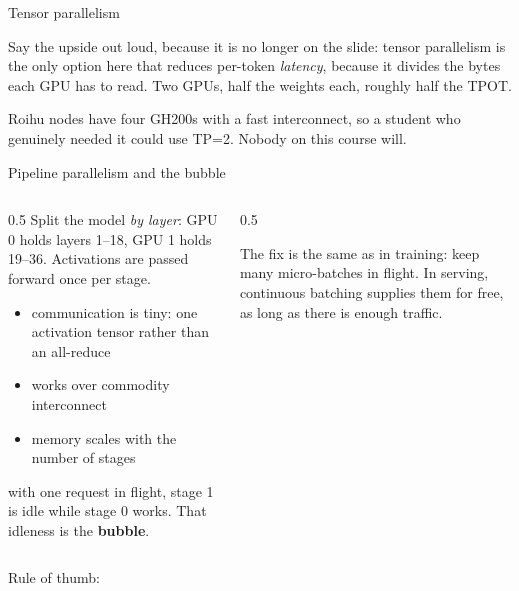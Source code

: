 \documentclass[aspectratio=169,10pt]{beamer}
\begin{document}
\begin{frame}{Tensor parallelism}
{  Say the upside out loud, because it is no longer on the slide: tensor
  parallelism is the only option here that reduces per-token \emph{latency},
  because it divides the bytes each GPU has to read. Two GPUs, half the weights
  each, roughly half the TPOT.

  Roihu nodes have four GH200s with a fast interconnect, so a student who
  genuinely needed it could use TP=2. Nobody on this course will.}
\end{frame}

\begin{frame}{Pipeline parallelism and the bubble}
  \begin{columns}[T,onlytextwidth]
    \begin{column}{0.5\textwidth}
      Split the model \emph{by layer}: GPU 0 holds layers 1--18, GPU 1 holds
      19--36. Activations are passed forward once per stage.
      \begin{itemize}\small
        \item communication is tiny: one activation tensor rather than an
          all-reduce
        \item works over commodity interconnect
        \item memory scales with the number of stages
      \end{itemize}
      \vspace{0.4em}
       with one request in flight, stage 1 is idle while stage 0
      works. That idleness is the \textbf{bubble}.
    \end{column}
    \begin{column}{0.5\textwidth}
      \centering

      \vspace{0.6em}
      \raggedright\small
      The fix is the same as in training: keep many micro-batches in flight.
      In serving, continuous batching supplies them for free, as long as there
      is enough traffic.
    \end{column}
  \end{columns}
  \vspace{0.5em}
  \centering
  \small
  Rule of thumb: 
\end{frame}
\end{document}
